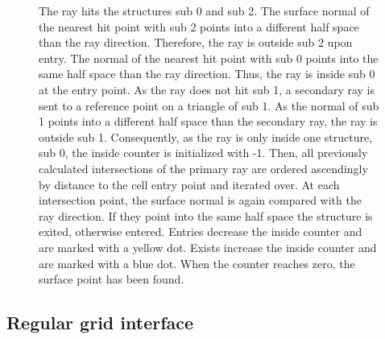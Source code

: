\begin{figure}
{		The ray hits the structures sub 0 and sub 2.
		The surface normal of the nearest hit point with sub 2 points into a different half space than the ray direction.
		Therefore, the ray is outside sub 2 upon entry.
		The normal of the nearest hit point with sub 0 points into the same half space than the ray direction.
		Thus, the ray is inside sub 0 at the entry point.
		As the ray does not hit sub 1, a secondary ray is sent to a reference point on a triangle of sub 1.
		As the normal of sub 1 points into a different half space than the secondary ray, the ray is outside sub 1.
		Consequently, as the ray is only inside one structure, sub 0, the inside counter is initialized with -1.
		Then, all previously calculated intersections of the primary ray are ordered ascendingly by distance to the cell entry point and iterated over.
		At each intersection point, the surface normal is again compared with the ray direction.
		If they point into the same half space the structure is exited, otherwise entered.
		Entries decrease the inside counter and are marked with a yellow dot.
		Exists increase the inside counter and are marked with a blue dot.
		When the counter reaches zero, the surface point has been found.
	}
	\label{fig:raycast}
\end{figure}


\subsection{Regular grid interface}
\label{sec:vml_implementation}


